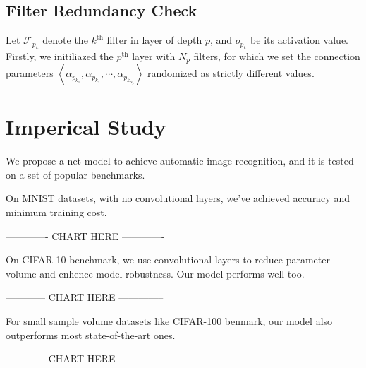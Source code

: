 \documentclass[conference]{IEEEtran}
\begin{document}
\subsection{Filter Redundancy Check}


Let $\mathcal{F}_{p_k}$ denote the $k^{\text{th}}$ filter in layer of
depth $p$, and $o_{p_k}$ be its activation value.
Firstly, we initiliazed the $p^{\text{th}}$ layer with $N_p$ filters,
for which we set the connection parameters
$\left<\alpha_{p_{k_1}},\alpha_{p_{k_2}},\cdots,\alpha_{p_{k_{N_p}}}\right>$
randomized as strictly different values.




\section{Imperical Study}
We propose a net model to achieve automatic image recognition, and it is tested
on a set of popular benchmarks.

On MNIST datasets, with no convolutional layers, we've achieved accuracy and
minimum training cost.

------------- CHART HERE -------------

On CIFAR-10 benchmark, we use convolutional layers to reduce parameter volume
and enhence model robustness. Our model performs well too.


------------ CHART HERE --------------


For small sample volume datasets like CIFAR-100 benmark, our model also outperforms
most state-of-the-art ones.


------------ CHART HERE --------------



%
%
\end{document}
